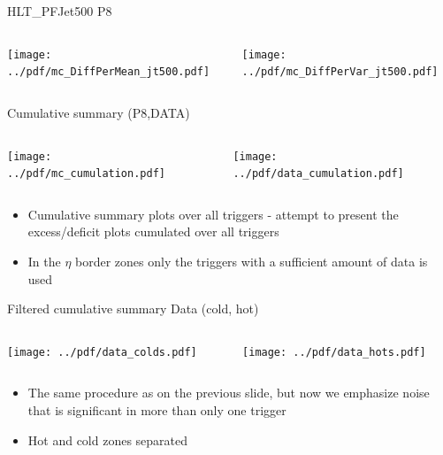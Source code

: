 \documentclass[9pt]{beamer}
\begin{document}
\begin{frame}[t]{HLT\_PFJet500 P8}
\begin{columns}[T]
  \begin{column}{.5\textwidth}
  \texttt{[image: ../pdf/mc\_DiffPerMean\_jt500.pdf]}
  \end{column}
  \begin{column}{.5\textwidth}
  \texttt{[image: ../pdf/mc\_DiffPerVar\_jt500.pdf]}
  \end{column}
\end{columns}
\end{frame}

\begin{frame}[t]{Cumulative summary (P8,DATA)}
\begin{columns}[T]
  \begin{column}{.5\textwidth}
  \texttt{[image: ../pdf/mc\_cumulation.pdf]}
  \end{column}
  \begin{column}{.5\textwidth}
  \texttt{[image: ../pdf/data\_cumulation.pdf]}
  \end{column}
\end{columns}
\begin{itemize}
 \item Cumulative summary plots over all triggers - attempt to present the excess/deficit plots cumulated over all triggers
 \item In the $\eta$ border zones only the triggers with a sufficient amount of data is used
\end{itemize}
\end{frame}

\begin{frame}[t]{Filtered cumulative summary Data (cold, hot)}
\begin{columns}[T]
  \begin{column}{.5\textwidth}
  \texttt{[image: ../pdf/data\_colds.pdf]}
  \end{column}
  \begin{column}{.5\textwidth}
  \texttt{[image: ../pdf/data\_hots.pdf]}
  \end{column}
\end{columns}
\begin{itemize}
 \item The same procedure as on the previous slide, but now we emphasize noise that is significant in more than only one trigger
 \item Hot and cold zones separated
\end{itemize}
\end{frame}
\end{document}
